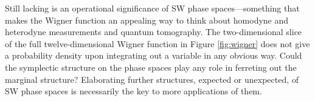 Still lacking is an operational significance of SW phase spaces---something that makes the Wigner function an appealing way to think about homodyne and heterodyne measurements and quantum tomography. The two-dimensional slice of the full twelve-dimensional Wigner function in Figure \ref{fig:wigner} does not give a probability density upon integrating out a variable in any obvious way. Could the symplectic structure on the phase spaces play any role in ferreting out the marginal structure? Elaborating further structures, expected or unexpected, of SW phase spaces is necessarily the key to more applications of them.



